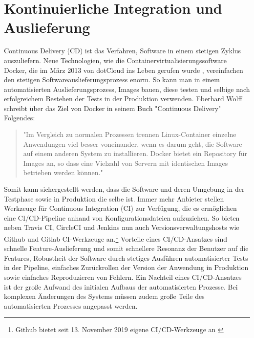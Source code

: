 \section{Kontinuierliche Integration und Auslieferung}
\label{sec:kontinuierlicheintegrationundauslieferung}
Continuous Delivery (CD) ist das Verfahren, Software in einem stetigen Zyklus auszuliefern.
Neue Technologien, wie die Containervirtualisierungssoftware Docker,
die im März 2013 von dotCloud ins Leben gerufen wurde \cite{DockerAbout2014}, vereinfachen
den stetigen Softwareauslieferungsprozess enorm. So kann man in einem automatisierten
Auslieferungsprozess, Images bauen, diese testen und selbige nach erfolgreichem
Bestehen der Tests in der Produktion verwenden. Eberhard Wolff schreibt über das Ziel von Docker in
seinem Buch "Continuous Delivery" Folgendes:

\begin{quote}
"Im Vergleich zu normalen Prozessen trennen Linux-Container
einzelne Anwendungen viel besser voneinander, wenn es darum geht, die Software auf einem anderen
System zu installieren. Docker bietet ein Repository für Images an, so dass eine Vielzahl
von Servern mit identischen Images betrieben werden können."\cite[S. 56]{ContinuousDeliveryWolff}
\end{quote}

Somit kann sichergestellt werden, dass die Software und deren Umgebung in der Testphase
sowie in Produktion die selbe ist. Immer mehr Anbieter stellen Werkzeuge für Continuous Integration (CI) zur Verfügung,
die es ermöglichen eine CI/CD-Pipeline anhand von Konfigurationsdateien aufzuziehen. So bieten
neben Travis CI, CircleCI und Jenkins nun auch Versionsverwaltungshosts wie Github und
Gitlab CI-Werkzeuge an.\footnote{Github bietet seit 13. November 2019 eigene CI/CD-Werkzeuge an \cite{GithubCIToolsHeise}}
Vorteile eines CI/CD-Ansatzes sind schnelle Feature-Auslieferung und somit schnellere Resonanz der Benutzer auf die Features,
Robustheit der Software durch stetiges Ausführen automatisierter Tests in der Pipeline, einfaches Zurückrollen
der Version der Anwendung in Produktion sowie einfaches Reproduzieren von Fehlern. Ein Nachteil eines CI/CD-Ansatzes ist
der große Aufwand des initialen Aufbaus der automatisierten Prozesse. Bei komplexen Änderungen des Systems müssen zudem
große Teile des automatisierten Prozesses angepasst werden.
